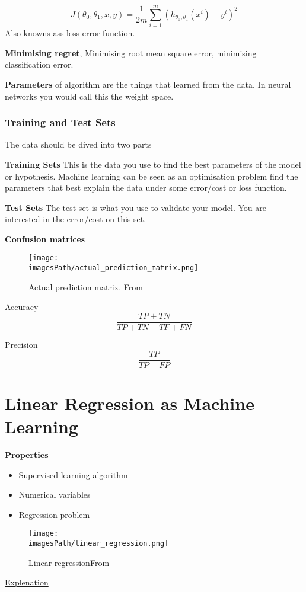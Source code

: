 \begin{multicols}{2}
\begin{equation*}
    J(\theta_0,\theta_1,x,y) = \frac{1}{2m}\sum_{i=1}^{m}(h_{\theta_0,\theta_1}(x^i)-y^i)^2
\end{equation*}
Also knowns ass loss error function.

\textbf{Minimising regret}, Minimising root mean square error, minimising
classification error.

\textbf{Parameters} of algorithm are the things that learned from the data. In
neural networks you would call this the weight space. 

\subsubsection{Training and Test Sets}
The data should be dived into two parts 

\textbf{Training Sets} This is the data you use to find the best parameters of the
model or hypothesis. Machine learning can be seen as an
optimisation problem find the parameters that best explain
the data under some error/cost or loss function.

\textbf{Test Sets} The test set is what you use to validate your model. You are
interested in the error/cost on this set.

\textbf{Confusion matrices}
\begin{figure}[H]
    \centering
    \texttt{[image: \\imagesPath/actual\_prediction\_matrix.png]}
    \caption{Actual prediction matrix. From \cite{iml}}
\end{figure}

Accuracy 
\begin{equation*}
    \frac{TP+TN}{TP+TN+TF+FN}
\end{equation*}

Precision 
\begin{equation*}
    \frac{TP}{TP+FP}
\end{equation*}


\section{Linear Regression as Machine Learning}
\textbf{Properties}
\begin{itemize}
    \item Supervised learning algorithm
    \item Numerical variables 
    \item Regression problem
\end{itemize}
\begin{figure}[H]
    \centering
    \texttt{[image: \\imagesPath/linear\_regression.png]}
    \caption{Linear regressionFrom \cite{iml}}
\end{figure}
\href{https://www.youtube.com/watch?v=nk2CQITm_eo}{Explenation}



\end{multicols}
